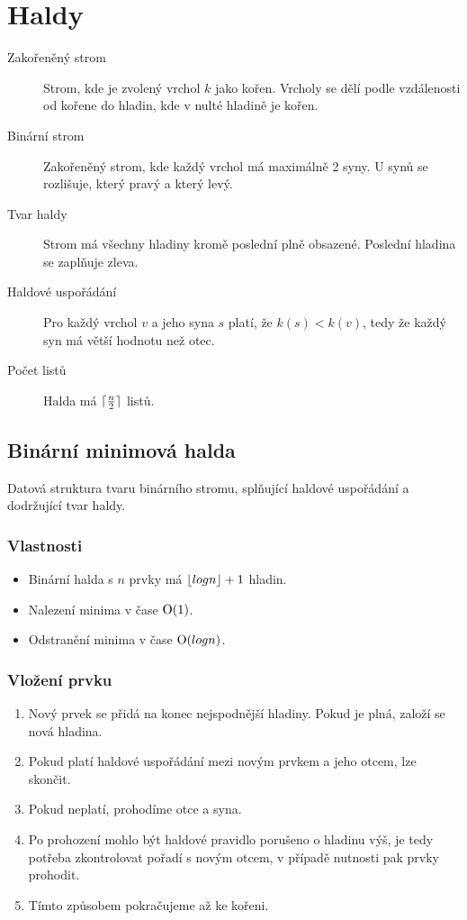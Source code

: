 \section{Haldy}

  \begin{description}
    \item[Zakořeněný strom] Strom, kde je zvolený vrchol $k$ jako kořen. Vrcholy se dělí podle vzdálenosti od kořene do hladin, kde v nulté hladině je kořen.
    \item[Binární strom] Zakořeněný strom, kde každý vrchol má maximálně 2 syny. U synů se rozlišuje, který pravý a který levý.
    \item[Tvar haldy] Strom má všechny hladiny kromě poslední plně obsazené. Poslední hladina se zaplňuje zleva.
    \item[Haldové uspořádání] Pro každý vrchol $v$ a jeho syna $s$ platí, že $k(s) < k(v)$, tedy že každý syn má větší hodnotu než otec.
    \item[Počet listů] Halda má $\lceil\frac{n}{2}\rceil$ listů.
  \end{description}

  \subsection{Binární minimová halda}
  Datová struktura tvaru binárního stromu, splňující haldové uspořádání a dodržující tvar haldy.

    \subsubsection{Vlastnosti}
      \begin{itemize}
        \item Binární halda s $n$ prvky má $\lfloor log n\rfloor + 1$ hladin.
        \item Nalezení minima v čase $\textrm O(1)$.
        \item Odstranění minima v čase $\textrm O(log n)$.
      \end{itemize}

    \subsubsection{Vložení prvku}
      \begin{enumerate}
        \item Nový prvek se přidá na konec nejspodnější hladiny. Pokud je plná, založí se nová hladina.
        \item Pokud platí haldové uspořádání mezi novým prvkem a jeho otcem, lze skončit.
        \item Pokud neplatí, prohodíme otce a syna.
        \item Po prohození mohlo být haldové pravidlo porušeno o hladinu výš, je tedy potřeba zkontrolovat pořadí s novým otcem, v případě nutnosti pak prvky prohodit.
        \item Tímto způsobem pokračujeme až ke kořeni.
      \end{enumerate}

